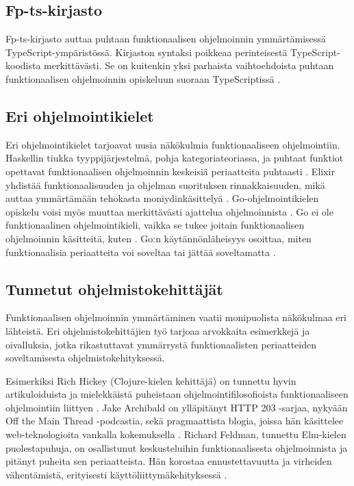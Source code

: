 \subsection{Fp-ts-kirjasto}

Fp-ts-kirjasto auttaa puhtaan funktionaalisen ohjelmoinnin ymmärtämisessä TypeScript-ympäristössä. Kirjaston syntaksi poikkeaa perinteisestä TypeScript-koodista merkittävästi. Se on kuitenkin yksi parhaista vaihtoehdoista puhtaan funktionaalisen ohjelmoinnin opiskeluun suoraan TypeScriptissä \cite{holvikari2021category}.

\subsection{Eri ohjelmointikielet}
Eri ohjelmointikielet tarjoavat uusia näkökulmia funktionaaliseen ohjelmointiin. Haskellin tiukka tyyppijärjestelmä, pohja kategoriateoriassa, ja puhtaat funktiot opettavat funktionaalisen ohjelmoinnin keskeisiä periaatteita puhtaasti \cite{haskellallmonad,haskellcomposition,haskellmonadlaws}. Elixir yhdistää funktionaalisuuden ja ohjelman suorituksen rinnakkaisuuden, mikä auttaa ymmärtämään tehokasta moniydinkäsittelyä \cite{elixir}. Go-ohjelmointikielen opiskelu voisi myös muuttaa merkittävästi ajattelua ohjelmoinnista \cite{golang}. Go ei ole funktionaalinen ohjelmointikieli, vaikka se tukee joitain funktionaalisen ohjelmoinnin käsitteitä, kuten . Go:n käytännönläheisyys osoittaa, miten funktionaalisia periaatteita voi soveltaa tai jättää soveltamatta \cite{golang}.

\subsection{Tunnetut ohjelmistokehittäjät}

Funktionaalisen ohjelmoinnin ymmärtäminen vaatii monipuolista näkökulmaa eri lähteistä. Eri ohjelmistokehittäjien työ tarjoaa arvokkaita esimerkkejä ja oivalluksia, jotka rikastuttavat ymmärrystä funktionaalisten periaatteiden soveltamisesta ohjelmistokehityksessä.

Esimerkiksi Rich Hickey (Clojure-kielen kehittäjä) on tunnettu hyvin artikuloiduista ja mielekkäistä puheistaan ohjelmointifilosofioista funktionaaliseen ohjelmointiin liittyen \cite{hickey_maybe_not,hickey_persistent_2009}. Jake Archibald on ylläpitänyt HTTP 203 -sarjaa, nykyään Off the Main Thread -podcastia, sekä pragmaattista blogia, joissa hän käsittelee web-teknologioita vankalla kokemuksella \cite{against_self_closing_tags,is_reduce_bad}. Richard Feldman, tunnettu Elm-kielen puolestapuhuja, on osallistunut keskusteluihin funktionaalisesta ohjelmoinnista ja pitänyt puheita sen periaatteista. Hän korostaa ennustettavuutta ja virheiden vähentämistä, erityisesti käyttöliittymäkehityksessä \cite{feldman_fp_pragmatists,impossiblebetter,stackoverflow:why_monad}.

